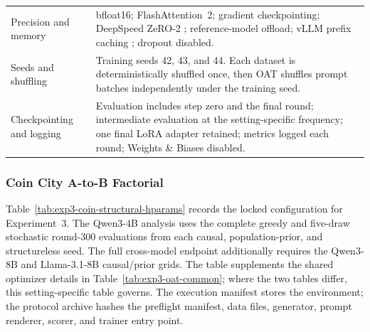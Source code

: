 \begin{center}
\begin{minipage}{\linewidth}
\begin{tabular}{p{.29\linewidth}p{.66\linewidth}}
Precision and memory & bfloat16; FlashAttention~2; gradient checkpointing;
DeepSpeed ZeRO-2 \citep{rajbhandari2020zero}; reference-model offload; vLLM prefix
caching \citep{kwon2023vllm}; dropout disabled. \\
Seeds and shuffling & Training seeds 42, 43, and 44.  Each dataset is deterministically
shuffled once, then OAT shuffles prompt batches independently under the training seed. \\
Checkpointing and logging & Evaluation includes step zero and the final round;
intermediate evaluation at the setting-specific frequency; one final LoRA adapter retained; metrics
logged each round; Weights \& Biases disabled. \\
\bottomrule
\end{tabular}
\end{minipage}
\end{center}


\subsubsection{Coin City A-to-B Factorial}
\label{app:exp3-coin-structural-hparams}

Table~\ref{tab:exp3-coin-structural-hparams} records the locked configuration
for Experiment~3. The Qwen3-4B analysis uses the complete greedy and five-draw
stochastic round-300 evaluations from each causal, population-prior, and
structureless seed. The full cross-model endpoint additionally requires the
Qwen3-8B and Llama-3.1-8B causal/prior grids. The table supplements the shared optimizer
details in Table~\ref{tab:exp3-oat-common}; where the two tables differ, this
setting-specific table governs. The execution manifest stores the environment;
the protocol archive hashes the preflight manifest, data files,
generator, prompt renderer, scorer, and trainer entry point.


